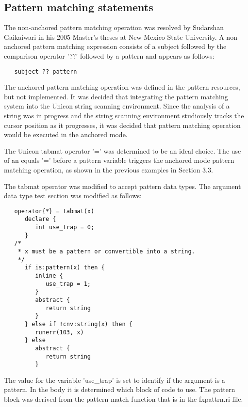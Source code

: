 \documentclass{article}
\begin{document}
\subsection{Pattern matching statements}
The non-anchored pattern matching operation was resolved by Sudarshan Gaikaiwari in his 2005 Master's theses at New Mexico State University.  A non-anchored pattern matching expression consists of a subject followed by the comparison operator '??' followed by a pattern and appears as follows:

\begin{verbatim}
   subject ?? pattern
\end{verbatim}

The anchored pattern matching operation was defined in the pattern resources, but not implemented.  It was decided that integrating the pattern matching system into the Unicon string scanning environment.  Since the analysis of a string was in progress and the string scanning environment studiously tracks the cursor position as it progresses, it was decided that pattern matching operation would be executed in the anchored mode.

The Unicon tabmat operator '=' was determined to be an ideal choice.  The use of an equals '=' before a pattern variable triggers the anchored mode pattern matching operation, as shown in the previous examples in Section 3.3.

The tabmat operator was modified to accept pattern data types.  The argument data type test section was modified as follows: 

\begin{verbatim}
   operator{*} = tabmat(x)
      declare {
         int use_trap = 0;
      }
   /*
    * x must be a pattern or convertible into a string.
    */
      if is:pattern(x) then {
         inline {
            use_trap = 1;
         }
         abstract {
            return string
         }
      } else if !cnv:string(x) then {
         runerr(103, x)
      } else 
         abstract {
            return string
         }
\end{verbatim}

The value for the variable 'use\_trap' is set to identify if the argument is a pattern.  In the body it is determined which block of code to use.  The pattern block was derived from the pattern match function that is in the fxpattrn.ri file.
\end{document}
